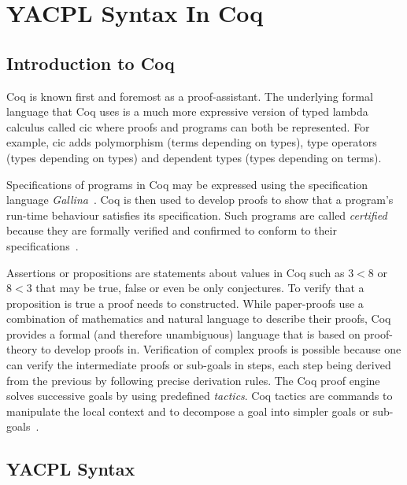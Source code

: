 \chapter{YACPL Syntax In Coq}\label{chap:odrl0syntaxcoq}

\section{Introduction to Coq}

Coq is known first and foremost as a proof-assistant. The underlying formal language that Coq uses is a much more expressive version of typed lambda calculus called \ac{cic} where proofs and programs can both be represented. For example, \ac{cic} adds polymorphism (terms depending on types), type operators (types depending on types) and dependent types (types depending on terms).

Specifications of programs in Coq may be expressed using the specification language \emph{Gallina}~\cite{gallinaref}. Coq is then used to develop proofs to show that a program's run-time behaviour satisfies its specification. Such programs are called \emph{certified} because they are formally verified and confirmed to conform to their specifications~\cite{BC04}.

Assertions or propositions are statements about values in Coq such as $3<8$ or $8<3$ that may be true, false or even be only conjectures. To verify that a proposition is true a proof needs to constructed. While paper-proofs use a combination of mathematics and natural language to describe their proofs, Coq provides a formal (and therefore unambiguous) language that is based on proof-theory to develop proofs in. Verification of complex proofs is possible because one can verify the intermediate proofs or sub-goals in steps, each step being derived from the previous by following precise derivation rules. The Coq proof engine solves successive goals by using predefined \emph{tactics}. Coq tactics are commands to manipulate the local context and to decompose a goal into simpler goals or sub-goals~\cite{BC04}.

\section{YACPL Syntax}\label{sec:agreementConstructor}

